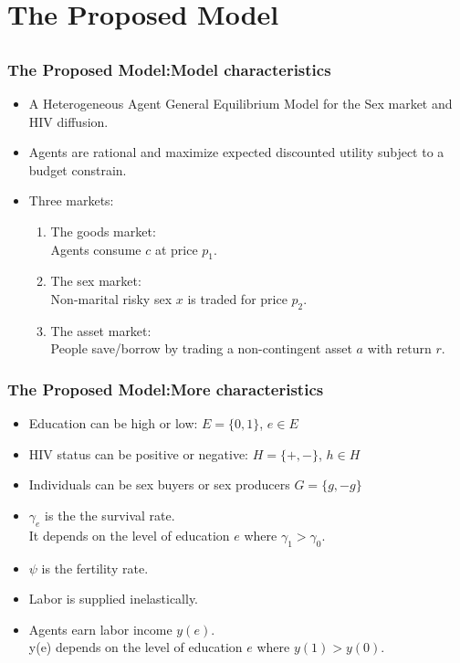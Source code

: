 \documentclass{beamer}
\begin{document}
\section{The Proposed Model}
\subsection{}
\begin{frame}
\frametitle{The Proposed Model:Model characteristics}
\begin{itemize}
\item A Heterogeneous Agent General Equilibrium Model for the Sex market and HIV diffusion.
\item Agents are rational and maximize expected discounted utility subject to a budget constrain.
\item Three markets:
\begin{enumerate}
\item The goods market: \\Agents consume $c$ at price $p_{1}$. 
\item The sex market: \\Non-marital risky sex $x$ is traded for price $p_{2}$.
\item The asset market: \\People save/borrow by trading a non-contingent asset $a$ with return $r$.
\end{enumerate}

\end{itemize}
\end{frame}

\begin{frame}
\frametitle{The Proposed Model:More characteristics}
\begin{itemize}
\item Education can be high or low: $E=\{0,1\}$, $e\in E$
\item HIV status can be positive or negative: $H=\{+,-\}$, $h\in H$
\item Individuals can be sex buyers or sex producers $G=\{g,-g\}$
\item $\gamma_{e}$ is the the survival rate. \\ It depends on the level of education $e$ where $\gamma_{1}>\gamma_{0}$.
\item $\psi$ is the fertility rate.
\item Labor is supplied inelastically.
\item Agents earn labor income $y(e)$. \\ y(e) depends on the level of education $e$ where $y(1)>y(0)$.
\end{itemize}

\end{frame}
\end{document}
